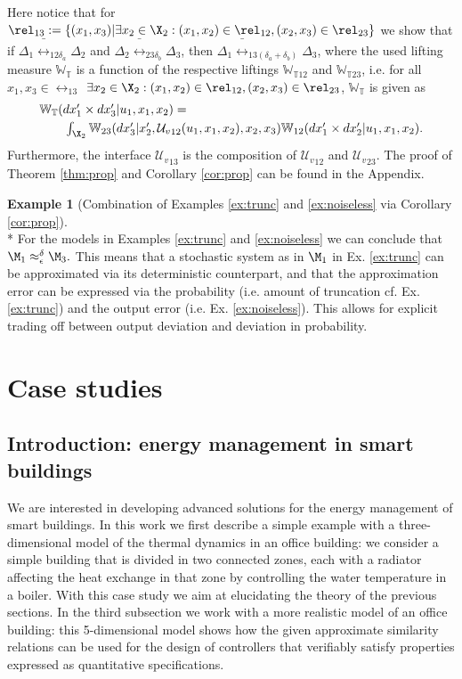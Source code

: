 \documentclass[letterpaper, 10 pt, conference]{amsart}
\theoremstyle{definition}
\theoremstyle{example}
\newtheorem{example}{Example}
\theoremstyle{remark}
\newcommand{\eps}{\epsilon}
\newcommand{\InF}{\mathcal{U}_{v}}
\newcommand{\Wt}{\mathbb{W}_{\mathbb{T}}}
\begin{document}
Here notice that for $\rel_{13}:=\{(x_1,x_3)|\exists x_2\in \X_2: (x_1,x_2)\in \rel_{12}, (x_2,x_3)\in \rel_{23}\}$ we show that if $\Delta_1\bar \rel_{12\delta_a}\Delta_2$ and  $\Delta_2\bar \rel_{23\delta_b}\Delta_3$, then $\Delta_1\bar \rel_{13(\delta_a+\delta_b)}\Delta_3$, where the used lifting measure $\mathbb W_{\mathbb T}$ is a function of the respective liftings $\mathbb W_{{\mathbb T}12}$ and $\mathbb W_{{\mathbb T}23}$, i.e. for all $x_1,x_3\in\rel_{13}$ $\exists x_2\in \X_2: (x_1,x_2)\in \rel_{12}, (x_2,x_3)\in \rel_{23}$, $\mathbb W_{\mathbb T}$ is given as  \begin{align*}&\textstyle\Wt(dx_1'\times dx_3'|u_1,x_1,x_2)=\\&\qquad \textstyle\int_{\X_2} \mathbb W_{23}(dx_3'|x_2',{\InF}_{12}(u_1,x_1,x_2),x_2,x_3)\mathbb W_{12}(dx_1'\times d x_2'|u_1,x_1,x_2).\end{align*}
Furthermore,  
the interface ${\InF}_{13}$ is  the composition of ${\InF}_{12}$ and ${\InF}_{23}$. The proof of Theorem \ref{thm:prop} and Corollary \ref{cor:prop} can be found in the Appendix. 

\begin{example}[Combination of Examples \ref{ex:trunc} and \ref{ex:noiseless} via Corollary \ref{cor:prop}]\mbox{ }\\*
For the models in Examples \ref{ex:trunc} and \ref{ex:noiseless} we can conclude that 
 \(\M_1\approx_{\eps}^\delta \M_3. \) 
This means that a stochastic system as in $\M_1$ in Ex.  \ref{ex:trunc}  can be approximated via its deterministic counterpart, 
and that the approximation error can be expressed via the probability (i.e. amount of truncation cf. Ex.  \ref{ex:trunc}) and the output error (i.e. Ex.  \ref{ex:noiseless}). This allows for explicit trading off between output deviation and deviation in probability. 
\end{example} 

\section{Case studies}\label{sec:case}
\subsection{Introduction: energy management in smart buildings}
We are interested in developing advanced solutions for the energy management of smart buildings.  
In this work we first describe a simple example with a three-dimensional model of the thermal dynamics in an office building: 
we consider a simple building that is divided in two connected zones, 
each with a radiator affecting the heat exchange in that zone by controlling the water temperature in a boiler. 
With this case study we aim at elucidating the theory of the previous sections. 
In the third subsection we work with a more realistic model of an office building: 
this 5-dimensional model shows how the given approximate similarity relations can be used for the design of controllers that verifiably satisfy properties expressed as quantitative specifications. 
\end{document}
